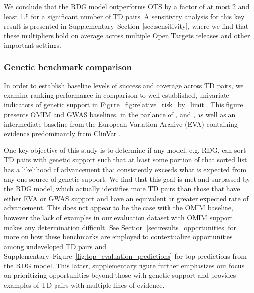 \documentclass{article}
\begin{document}
We conclude that the RDG model outperforms OTS by a factor of at most 2 and least 1.5 for a significant number of TD pairs. A sensitivity analysis for this key result is presented in Supplementary~Section~\ref{sec:sensitivity}, where we find that these multipliers hold on average across multiple Open Targets releases and other important settings.

\subsubsection{Genetic benchmark comparison}

In order to establish baseline levels of success and coverage across TD pairs, we examine ranking performance in comparison to well established, univariate indicators of genetic support in Figure~\ref{fig:relative_risk_by_limit}. This figure presents OMIM and GWAS baselines, in the parlance of \cite{King2019-rc}, \cite{Nelson2015-eg} and \cite{Minikel2023.06.23.23291765}, as well as an intermediate baseline from the European Variation Archive (EVA) \cite{PMID:34718739} containing evidence predominantly from ClinVar \cite{PMID:24234437}.

One key objective of this study is to determine if any model, e.g. RDG, can sort TD pairs with genetic support such that at least some portion of that sorted list has a likelihood of advancement that consistently exceeds what is expected from any one source of genetic support. We find that this goal is met and surpassed by the RDG model, which actually identifies more TD pairs than those that have either EVA or GWAS support and have an equivalent or greater expected rate of advancement. This does not appear to be the case with the OMIM baseline, however the lack of examples in our evaluation dataset with OMIM support makes any determination difficult. See Section~\ref{sec:results_opportunities} for more on how these benchmarks are employed to contextualize opportunities among undeveloped TD pairs and Supplementary~Figure~\ref{fig:top_evaluation_predictions} for top predictions from the RDG model. This latter, supplementary figure further emphasizes our focus on prioritizing opportunities beyond those with genetic support and provides examples of TD pairs with multiple lines of evidence.
\end{document}
